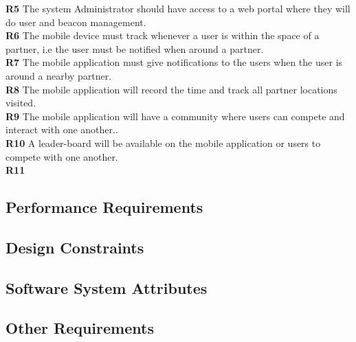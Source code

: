 \documentclass[11pt]{article}
\begin{document}
\textbf{R5} The system Administrator should have access to a web portal where they will do user and beacon management. \\
\textbf{R6} The mobile device must track whenever a user is within the space of a partner, i.e the user must be notified when around a partner. \\
\textbf{R7} The mobile application must give notifications to the users when the user is around a nearby partner. \\
\textbf{R8} The mobile application will record the time and track all partner locations visited. \\
\textbf{R9} The mobile application will have a community where users can compete and interact with one another..\\
\textbf{R10} A leader-board will be available on the mobile application or users to compete with one another.  \\
\textbf{R11}
\subsection{Performance Requirements}
\subsection{Design Constraints}
\subsection{Software System Attributes}
\subsection{Other Requirements}
\end{document}
